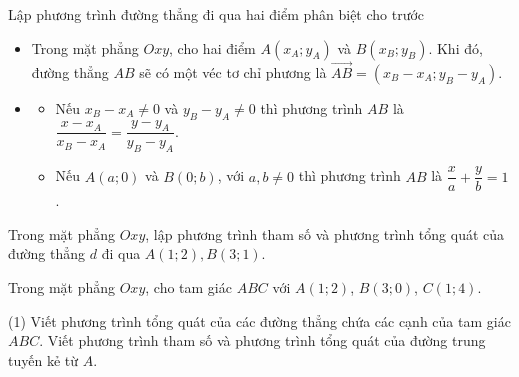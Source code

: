 \begin{dang}{Lập phương trình đường thẳng đi qua hai điểm phân biệt cho trước}
	\begin{itemize}
		\item [\iconMT] Trong mặt phẳng $Oxy$, cho hai điểm $A(x_A;y_A)$ và $B(x_B;y_B)$. Khi đó, đường thẳng $AB$ sẽ có một véc tơ chỉ phương là $\vec{AB}=(x_B-x_A;y_B-y_A)$.
		\item [\iconMT] 
		\begin{itemize}
			\item [$\bullet$] Nếu $x_B-x_A \ne 0$ và $y_B-y_A \ne 0$ thì phương trình $AB$ là
			$\dfrac{x-x_A}{x_B-x_A}=\dfrac{y-y_A}{y_B-y_A}$.
			\item [$\bullet$] Nếu $A(a;0)$ và $B(0;b)$, với $a,b \ne 0$ thì phương trình $AB$ là $\dfrac{x}{a}+\dfrac{y}{b}=1$.
		\end{itemize}
	\end{itemize}
\end{dang}
\begin{vd}
	Trong mặt phẳng $Oxy$,  lập phương trình tham số và phương trình tổng quát của đường thẳng $d$ đi qua $A \left(1; 2 \right), B \left(3;1 \right)$.
\end{vd}

\begin{vd}
	Trong mặt phẳng $Oxy$, cho tam giác $ABC$ với $A(1;2)$, $B(3;0)$, $C(1;4)$.
	\begin{tasks}(1)
		\task Viết phương trình tổng quát của các đường thẳng chứa các cạnh của tam giác $ABC$.
		\task Viết phương trình tham số và phương trình tổng quát của đường trung tuyến kẻ từ $A$.
	\end{tasks}
	\loigiai{}
\end{vd}

